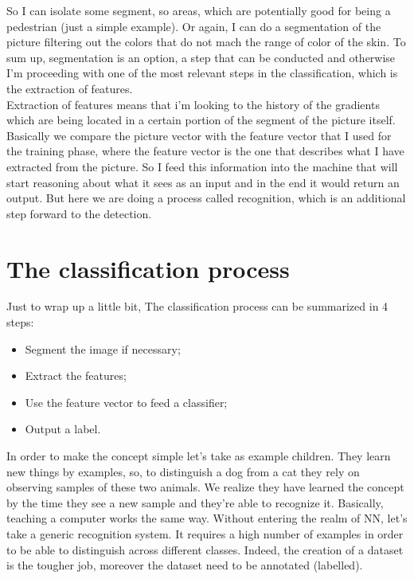 So I can isolate some segment, so areas, which are potentially good for being a pedestrian (just a simple example).
Or again, I can do a segmentation of the picture filtering out the colors that do not mach the range of color of the skin.
To sum up, segmentation is an option, a step that can be conducted and otherwise I'm proceeding with one of the most relevant steps in the classification, which is the extraction of features.
\\
Extraction of features means that i'm looking to the history of the gradients which are being located in a certain portion of the segment of the picture itself.
Basically we compare the picture vector with the feature vector that I used for the training phase, where the feature vector is the one that describes what I have extracted from the picture.
So I feed this information into the machine that will start reasoning about what it sees as an input and in the end it would return an output.
But here we are doing a process called recognition, which is an additional step forward to the detection.
\section{The classification process}
Just to wrap up a little bit, The classification process can be summarized in 4 steps:
\begin{itemize}
    \item Segment the image if necessary;
    \item Extract the features;
    \item Use the feature vector to feed a classifier;
    \item Output a label.
\end{itemize}
In order to make the concept simple let's take as example children. They learn new things by examples, so, to distinguish a dog from a cat they rely on observing samples of these two animals. 
We realize they have learned the concept by the time they see a new sample and they’re able to recognize it.
Basically, teaching a computer works the same way.
Without entering the realm of NN, let's take a generic recognition system. It requires a high number of examples in order to be able to distinguish across different classes.
Indeed, the creation of a dataset is the tougher job, moreover the dataset need to be annotated (labelled).
